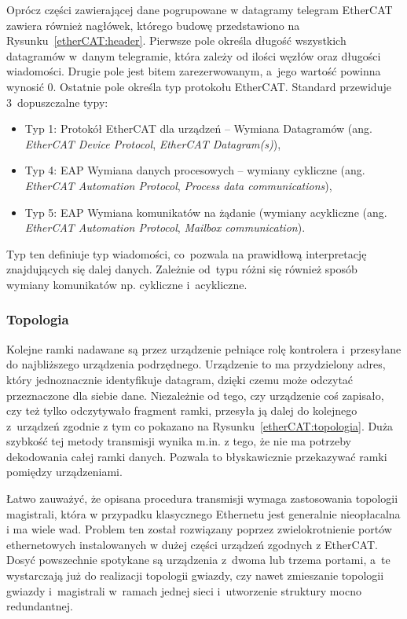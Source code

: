 
Oprócz części zawierającej dane pogrupowane w datagramy telegram EtherCAT zawiera również nagłówek, którego budowę  przedstawiono na Rysunku~\ref{etherCAT:header}. Pierwsze pole określa długość wszystkich datagramów w~danym telegramie, która zależy od ilości węzłów oraz długości wiadomości. Drugie pole jest bitem zarezerwowanym, a~jego wartość powinna wynosić 0. Ostatnie pole określa typ protokołu EtherCAT. 
\clearpage
Standard przewiduje 3~dopuszczalne typy:
\begin{itemize}
\item Typ 1: Protokół EtherCAT dla urządzeń -- Wymiana Datagramów (ang. \textit{EtherCAT Device Protocol}, \textit{EtherCAT Datagram(s)}),
\item Typ 4: EAP Wymiana danych procesowych -- wymiany cykliczne (ang. \textit{EtherCAT Automation Protocol}, \textit{Process data communications}),
\item Typ 5: EAP Wymiana komunikatów na żądanie (wymiany acykliczne (ang. \textit{EtherCAT Automation Protocol}, \textit{Mailbox communication}).
\end{itemize}
Typ ten definiuje typ wiadomości, co~pozwala na prawidłową interpretację znajdujących się dalej danych. Zależnie od~typu różni się również sposób wymiany komunikatów np. cykliczne i~acykliczne.

\subsubsection{Topologia}
Kolejne ramki nadawane są przez urządzenie pełniące rolę kontrolera i~przesyłane do najbliższego urządzenia podrzędnego. Urządzenie to ma przydzielony adres, który jednoznacznie identyfikuje datagram, dzięki czemu może odczytać przeznaczone dla siebie dane. Niezależnie od tego, czy urządzenie coś zapisało, czy też tylko odczytywało fragment ramki, przesyła ją dalej do kolejnego z~urządzeń zgodnie z tym co pokazano na Rysunku~\ref{etherCAT:topologia}. Duża szybkość tej metody transmisji wynika m.in. z tego, że nie ma potrzeby dekodowania całej ramki danych. Pozwala to błyskawicznie przekazywać ramki pomiędzy urządzeniami.


Łatwo zauważyć, że opisana procedura transmisji wymaga zastosowania topologii magistrali, która w przypadku klasycznego Ethernetu jest generalnie nieopłacalna i ma wiele wad. Problem ten został rozwiązany poprzez zwielokrotnienie portów ethernetowych instalowanych w dużej części urządzeń zgodnych z EtherCAT.
Dosyć powszechnie spotykane są urządzenia z~dwoma lub trzema portami, a~te wystarczają już do realizacji topologii gwiazdy, czy nawet zmieszanie topologii gwiazdy i~magistrali w~ramach jednej sieci i~utworzenie struktury mocno redundantnej.

